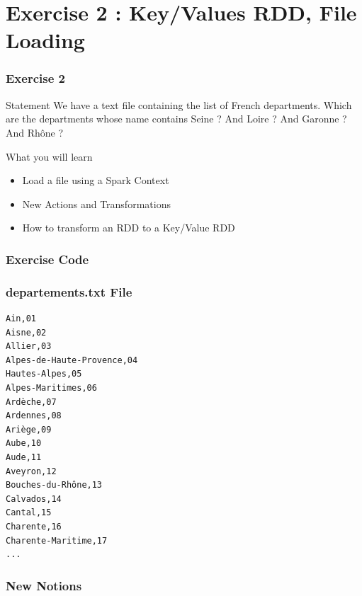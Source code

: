 \documentclass[slidetop,9pt,utf8]{beamer}
\begin{document}
\begin{CJK}{UTF8}{gbsn}
\begin{frame}
\end{frame}

\section{Exercise 2 : Key/Values RDD, File Loading}

\begin{frame}
  \frametitle{Exercise 2}

  \begin{block}{Statement}
    We have a text file containing the list of French departments. Which are the departments whose name contains Seine ? And Loire ? And Garonne ? And Rhône ?
  \end{block}

  \begin{block}{What you will learn}
    \begin{itemize}
      \item Load a file using a Spark Context
      \item New Actions and Transformations
      \item How to transform an RDD to a Key/Value RDD
    \end{itemize}
  \end{block}

\end{frame}

\begin{frame}
  \frametitle{Exercise Code}

  

\end{frame}

\begin{frame}[fragile]
  \frametitle{departements.txt File}

  \begin{verbatim}
Ain,01
Aisne,02
Allier,03
Alpes-de-Haute-Provence,04
Hautes-Alpes,05
Alpes-Maritimes,06
Ardèche,07
Ardennes,08
Ariège,09
Aube,10
Aude,11
Aveyron,12
Bouches-du-Rhône,13
Calvados,14
Cantal,15
Charente,16
Charente-Maritime,17
...
  \end{verbatim}

\end{frame}

\begin{frame}[fragile]
  \frametitle{New Notions}


\end{frame}
\end{CJK}
\end{document}

